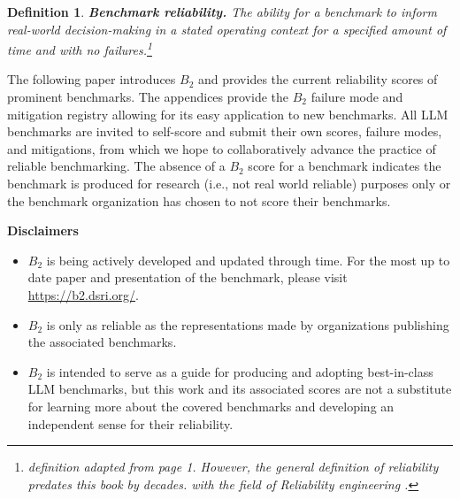 \documentclass{article}
\newtheorem{dfn}{Definition}[section]
\newcommand\bb{$B_2$ }
\begin{document}
\begin{dfn}
\label{dfn:benchmark_reliability}
{\bf Benchmark reliability.} The ability for a benchmark to inform real-world decision-making in a stated operating context for a specified amount of time and with no failures.\footnote{ definition adapted from \cite{Rausand2004} page 1. However, the general definition of reliability predates this book by decades. \cite{ReliabilityMcLinn} with the field of Reliability engineering .}
\end{dfn}



The following paper introduces \bb and provides the current reliability scores of prominent benchmarks. The appendices provide the \bb failure mode and mitigation registry allowing for its easy application to new benchmarks. All LLM benchmarks are invited to self-score and submit their own scores, failure modes, and mitigations, from which we hope to collaboratively advance the practice of reliable benchmarking. The absence of a \bb score for a benchmark indicates the benchmark is produced for research (i.e., not real world reliable) purposes only or the benchmark organization has chosen to not score their benchmarks.

\begin{center}
    \begin{tcolorbox}[colback=blue!10, colframe=blue!50, width=\textwidth, boxrule=0.5mm, sharp corners, coltext=black, halign=left]
\textbf{Disclaimers}
\begin{itemize}
\item \bb is being actively developed and updated through time. For the most up to date paper and presentation of the benchmark, please visit \url{https://b2.dsri.org/}.
\item \bb is only as reliable as the representations made by organizations publishing the associated benchmarks.
\item \bb is intended to serve as a guide for producing and adopting best-in-class LLM benchmarks, but this work and its associated scores are not a substitute for learning more about the covered benchmarks and developing an independent sense for their reliability.
\end{itemize}
    \end{tcolorbox}
\end{center}
\end{document}
